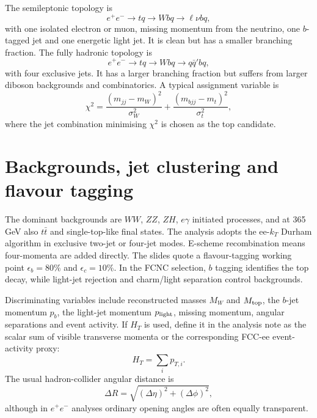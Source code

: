 \documentclass[11pt,a4paper]{report}
\newcommand{\ee}{e^+e^-}
\newcommand{\ttbar}{t\bar t}
\begin{document}
The semileptonic topology is
\begin{equation}
  \ee\to tq\to Wbq\to \ell\nu bq,
\end{equation}
with one isolated electron or muon, missing momentum from the neutrino, one $b$-tagged jet and one energetic light jet.  It is clean but has a smaller branching fraction.  The fully hadronic topology is
\begin{equation}
  \ee\to tq\to Wbq\to q\bar q' bq,
\end{equation}
with four exclusive jets.  It has a larger branching fraction but suffers from larger diboson backgrounds and combinatorics.  A typical assignment variable is
\begin{equation}
  \chi^2=\frac{(m_{jj}-m_W)^2}{\sigma_W^2}+\frac{(m_{bjj}-m_t)^2}{\sigma_t^2},
\end{equation}
where the jet combination minimising $\chi^2$ is chosen as the top candidate.

\section{Backgrounds, jet clustering and flavour tagging}

The dominant backgrounds are $WW$, $ZZ$, $ZH$, $e\gamma$ initiated processes, and at 365 GeV also $\ttbar$ and single-top-like final states.  The analysis adopts the ee-$k_T$ Durham algorithm in exclusive two-jet or four-jet modes.  E-scheme recombination means four-momenta are added directly.  The slides quote a flavour-tagging working point $\epsilon_b=80\%$ and $\epsilon_c=10\%$.  In the FCNC selection, $b$ tagging identifies the top decay, while light-jet rejection and charm/light separation control backgrounds.

Discriminating variables include reconstructed masses $M_W$ and $M_{\rm top}$, the $b$-jet momentum $p_b$, the light-jet momentum $p_{\rm light}$, missing momentum, angular separations and event activity.  If $H_T$ is used, define it in the analysis note as the scalar sum of visible transverse momenta or the corresponding FCC-ee event-activity proxy:
\begin{equation}
  H_T=\sum_i p_{T,i}.
\end{equation}
The usual hadron-collider angular distance is
\begin{equation}
  \Delta R=\sqrt{(\Delta\eta)^2+(\Delta\phi)^2},
\end{equation}
although in $\ee$ analyses ordinary opening angles are often equally transparent.
\end{document}

